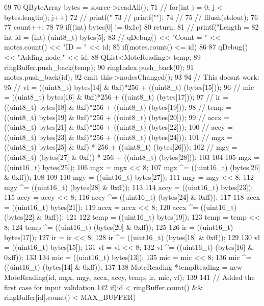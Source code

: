 \begin{DoxyCode}
69 {
70     QByteArray bytes = source->readAll();
71 //    for(int j = 0; j < bytes.length(); j++)
72 //        printf("%
73 //    printf("\n");
74 //
75 //    fflush(stdout);
76 
77     count++;
78 
79     if((int) bytes[0] != 0x1c)
80         return;
81 //      printf("Length = %
82       int id = (int) (uint8_t) bytes[5];
83     //  qDebug() << "Count = " << motes.count() << "ID = " << id;
85       if(motes.count() <= id)
86       {
87           qDebug() << "Adding node " << id;
88           QList<MoteReading> temp;
89           ringBuffer.push_back(temp);
90           ringIndex.push_back(0);
91           motes.push_back(id);
92           emit this->nodesChanged();
93       }
94 // This doesnt work:
95 //      vl = ((uint8_t) bytes[14] & 0xf)*256  + ((uint8_t) (bytes[15]));
96 //      mic = ((uint8_t) bytes[16] & 0xf)*256 + ((uint8_t) (bytes[17]));
97 //      ir = ((uint8_t) bytes[18] & 0xf)*256 + ((uint8_t) (bytes[19]));
98 //      temp = ((uint8_t) bytes[19] & 0xf)*256 + ((uint8_t) (bytes[20]));
99 //      accx = ((uint8_t) bytes[21] & 0xf)*256  + ((uint8_t) (bytes[22]));
100 //      accy = ((uint8_t) bytes[23] & 0xf)*256 + ((uint8_t) (bytes[24]));
101 //      mgx = ((uint8_t) bytes[25] & 0xf) * 256 + ((uint8_t) (bytes[26]));
102 //      mgy = ((uint8_t) (bytes[27] & 0xf)) * 256 + ((uint8_t) (bytes[28]));
103 
104 
105       mgx = ((uint16_t) bytes[25]);
106       mgx = mgx << 8;
107       mgx ^= ((uint16_t) (bytes[26] & 0xff));
108 
109 
110       mgy = ((uint16_t) bytes[27]);
111       mgy = mgy << 8;
112       mgy ^= ((uint16_t) (bytes[28] & 0xff));
113 
114       accy = ((uint16_t) bytes[23]);
115       accy = accy << 8;
116       accy ^= ((uint16_t) (bytes[24] & 0xff));
117 
118       accx = ((uint16_t) bytes[21]);
119       accx = accx << 8;
120       accx ^= ((uint16_t) (bytes[22] & 0xff));
121 
122       temp = ((uint16_t) bytes[19]);
123       temp = temp << 8;
124       temp ^= ((uint16_t) (bytes[20] & 0xff));
125 
126       ir = ((uint16_t) bytes[17]);
127       ir = ir << 8;
128       ir ^= ((uint16_t) (bytes[18] & 0xff));
129 
130       vl = ((uint16_t) bytes[15]);
131       vl = vl << 8;
132       vl ^= ((uint16_t) (bytes[16] & 0xff));
133 
134       mic = ((uint16_t) bytes[13]);
135       mic = mic << 8;
136       mic ^= ((uint16_t) (bytes[14] & 0xff));
137 
138       MoteReading *tempReading = new MoteReading(id, mgx, mgy, accx, accy, temp, 
      ir, mic, vl);
139 
141       // Added the first case for input validation
142       if(id < ringBuffer.count() && ringBuffer[id].count() < MAX_BUFFER)
}
\end{DoxyCode}
